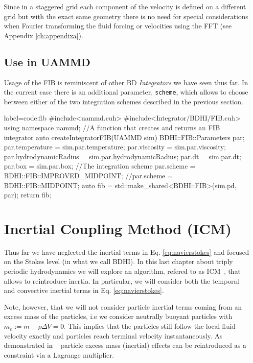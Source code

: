 \documentclass[twoside,openright,titlepage,numbers=noenddot,%
headinclude,footinclude,cleardoublepage=empty,abstract=on,
BCOR=5mm,fontsize=11pt, dvipsnames, paper=b5
]{scrreprt}
\def\ucpp{uammd_cpp_lexer.py:UAMMDCppLexer -x}
\begin{document}
Since in a staggered grid each component of the velocity is defined on a different grid but with the exact same geometry there is no need for special considerations when Fourier transforming the fluid forcing or velocities using the \gls{FFT} (see Appendix \ref{ch:appendixa}).
\subsection*{Use in UAMMD}
Usage of the \gls{FIB} is reminiscent of other \gls{BD} \emph{Integrators} we have seen thus far. In the current case there is an additional parameter, \texttt{scheme}, which allows to choose between either of the two integration schemes described in the previous section.

\begin{code2}{label=code:fib}
#include<uammd.cuh>
#include<Integrator/BDHI/FIB.cuh>
using namespace uammd;
//A function that creates and returns an FIB integrator
auto createIntegratorFIB(UAMMD sim){   
  BDHI::FIB::Parameters par;
  par.temperature = sim.par.temperature;
  par.viscosity = sim.par.viscosity;
  par.hydrodynamicRadius = sim.par.hydrodynamicRadius;
  par.dt = sim.par.dt;  
  par.box = sim.par.box;
  //The integration scheme
  par.scheme = BDHI::FIB::IMPROVED_MIDPOINT;
  //par.scheme = BDHI::FIB::MIDPOINT;
  auto fib = std::make_shared<BDHI::FIB>(sim.pd, par);
  return fib;
}
\end{code2}





\section{Inertial Coupling Method (ICM)}\label{ch:icm}
Thus far we have neglected the inertial terms in Eq. \eqref{eq:navierstokes} and focused on the Stokes level (in what we call \gls{BDHI}). In this last chapter about triply periodic hydrodynamics we will explore an algorithm, refered to as \gls{ICM}~\cite{Balboa2014}, that allows to reintroduce inertia. In particular, we will consider both the temporal and convective inertial terms in Eq. \eqref{eq:navierstokes}.

Note, however, that we will not consider particle inertial terms coming from an excess mass of the particles, i.e we consider neutrally buoyant particles with $m_e := m - \rho\Delta V = 0$. This implies that the particles still follow the local fluid velocity exactly and particles reach terminal velocity instantaneously. As demonstrated in ~\cite{Balboa2014} particle excess mass (inertial) effects can be reintroduced as a constraint via a Lagrange multiplier.
\end{document}

